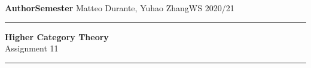 \documentclass[a4paper,11pt,openany]{scrartcl}
\begin{document}
\noindent\textbf{Author}\hfill\textbf{Semester} \linebreak
\vspace*{-.1cm} Matteo Durante, Yuhao Zhang\hfill WS 2020/21 \\

\noindent
\rule{\linewidth}{1pt}
\begin{center}
\Large
\textbf{Higher Category Theory} \\
Assignment 11
\end{center}
\rule{\linewidth}{1pt}
\\


\newcommand{\La}{\Lambda}
\newcommand{\pa}{\partial}
\newcommand{\ob}{\operatorname{Ob}}
\newcommand{\mor}{\operatorname{Mor}}
\newcommand{\sto}{\twoheadrightarrow}

\newcommand{\plim}{\varprojlim}
\newcommand{\sst}{\subseteq}
\newcommand{\eq}{\operatorname{eq}}

\newcommand{\f}{\varphi}

\newcommand{\sing}{\operatorname{Sing}}

\newcommand{\ihom}{\underline{\Hom}}

\newcommand{\N}{\mathbb{N}}
\end{document}
